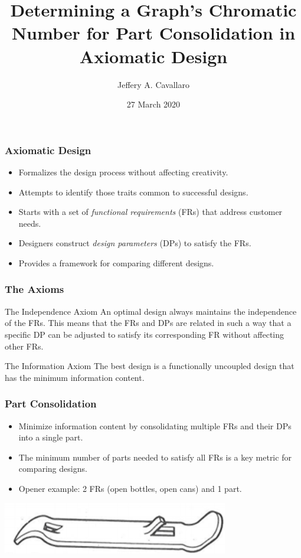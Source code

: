 \documentclass{beamer}
\title{Determining a Graph's Chromatic Number for Part Consolidation in Axiomatic Design}
\author{Jeffery A. Cavallaro}
\institute{San Jose State University \\ Department of Mathematics}
\date{27 March 2020}
\begin{document}
\frame{\titlepage}

\begin{frame}
  \frametitle{Axiomatic Design}
  \begin{itemize}
  \item Formalizes the design process without affecting creativity.
  \item Attempts to identify those traits common to successful designs.
  \item Starts with a set of \emph{functional requirements} (FRs) that address customer needs.
  \item Designers construct \emph{design parameters} (DPs) to satisfy the FRs.
  \item Provides a framework for comparing different designs.
  \end{itemize}
\end{frame}

\begin{frame}
  \frametitle{The Axioms}
  \begin{block}{The Independence Axiom}
    An optimal design always maintains the independence of the FRs. This means that the FRs and DPs are related in
    such a way that a specific DP can be adjusted to satisfy its corresponding FR without affecting other FRs.
  \end{block}
  \begin{block}{The Information Axiom}
    The best design is a functionally uncoupled design that has the minimum information content.
  \end{block}
\end{frame}

\begin{frame}
  \frametitle{Part Consolidation}
  \begin{itemize}
  \item Minimize information content by consolidating multiple FRs and their DPs into a single part.
  \item The minimum number of parts needed to satisfy all FRs is a key metric for comparing designs.
  \item Opener example: 2 FRs (open bottles, open cans) and 1 part.
  \end{itemize}

  \begin{center}
    \includegraphics[scale=0.5]{../final/opener}
  \end{center}
\end{frame}
\end{document}
